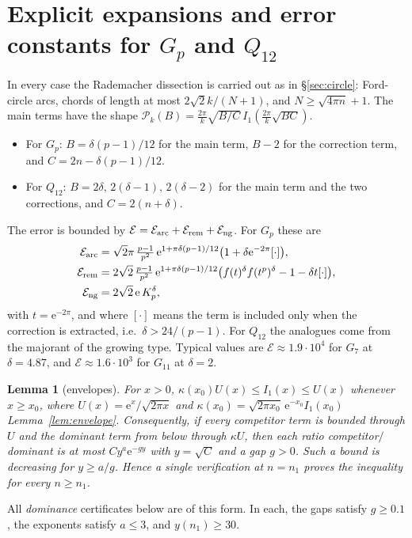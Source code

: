 \documentclass[11pt]{amsart}
\newtheorem{lemma}[theorem]{Lemma}
\theoremstyle{remark}
\theoremstyle{definition}
\newcommand{\cP}{\mathcal P}
\newcommand{\cE}{\mathcal E}
\newcommand{\e}{\mathrm e}
\begin{document}
\section{Explicit expansions and error constants for $G_p$ and $Q_{12}$}\label{sec:circleB}
In every case the Rademacher dissection is carried out as in \S\ref{sec:circle}: Ford-circle arcs, chords of length at most $2\sqrt2k/(N+1)$, and $N\ge\sqrt{4\pi n}+1$. The main terms have the shape $\cP_k(B)=\frac{2\pi}k\sqrt{B/C}\,I_1(\frac{2\pi}k\sqrt{BC})$.
\begin{itemize}[leftmargin=2em]
\item For $G_p$: $B=\delta(p-1)/12$ for the main term, $B-2$ for the correction term, and $C=2n-\delta(p-1)/12$.
\item For $Q_{12}$: $B=2\delta,\,2(\delta-1),\,2(\delta-2)$ for the main term and the two corrections, and $C=2(n+\delta)$.
\end{itemize}
The error is bounded by $\cE=\cE_{\rm arc}+\cE_{\rm rem}+\cE_{\rm ng}$. For $G_p$ these are
\begin{align*}
\cE_{\rm arc}&=\sqrt2\pi\,\tfrac{p-1}{p^2}\,\e^{1+\pi\delta(p-1)/12}\big(1+\delta\e^{-2\pi}[\cdot]\big),\\
\cE_{\rm rem}&=2\sqrt2\,\tfrac{p-1}{p^2}\,\e^{1+\pi\delta(p-1)/12}\big(f(t)^\delta f(t^p)^\delta-1-\delta t[\cdot]\big),\\
\cE_{\rm ng}&=2\sqrt2\,\e\,K_p^\delta,
\end{align*}
with $t=\e^{-2\pi}$, and where $[\cdot]$ means the term is included only when the correction is extracted, i.e.\ $\delta>24/(p-1)$. For $Q_{12}$ the analogues come from the majorant of the growing type. Typical values are $\cE\approx1.9\cdot10^4$ for $G_7$ at $\delta=4.87$, and $\cE\approx1.6\cdot10^3$ for $G_{11}$ at $\delta=2$.

\begin{lemma}[envelopes]\label{lem:env}
For $x>0$, $\kappa(x_0)U(x)\le I_1(x)\le U(x)$ whenever $x\ge x_0$, where $U(x)=\e^x/\sqrt{2\pi x}$ and $\kappa(x_0)=\sqrt{2\pi x_0}\,\e^{-x_0}I_1(x_0)$ Lemma~\ref{lem:envelope}. Consequently, if every competitor term is bounded through $U$ and the dominant term from below through $\kappa U$, then each ratio competitor$/$dominant is at most $Cy^a\e^{-gy}$ with $y=\sqrt C$ and a gap $g>0$. Such a bound is decreasing for $y\ge a/g$. Hence a single verification at $n=n_1$ proves the inequality for every $n\ge n_1$.
\end{lemma}
All \emph{dominance} certificates below are of this form. In each, the gaps satisfy $g\ge0.1$, the exponents satisfy $a\le3$, and $y(n_1)\ge30$.
\end{document}
